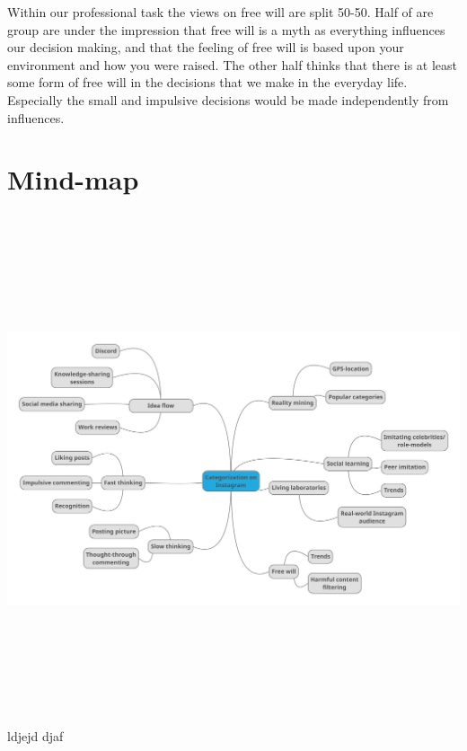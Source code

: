 \documentclass{article}
\begin{document}
Within our professional task the views on free will are split 50-50. Half of are group are under the impression that free will is a myth as everything influences our decision making, and that the feeling of free will is based upon your environment and how you were raised. The other half thinks that there is at least some form of free will in the decisions that we make in the everyday life. Especially the small and impulsive decisions would be made independently from influences.

\section{Mind-map}
    \includegraphics[width=15cm,height=15cm,keepaspectratio]{mindmap.pdf}
    ldjejd djaf 

\pagebreak
\printglossary[type=\acronymtype,title=\section{Abbreviations}]
\end{document}
